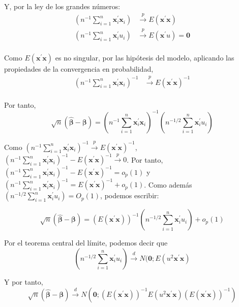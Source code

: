 Y, por la ley de los grandes n\'umeros:
\begin{align*}
\left(n^{-1}\sum_{i=1}^n\boldsymbol{x}_i^{\prime}\boldsymbol{x}_i\right)&\overset{p}{\to}E(\boldsymbol{x}^{\prime}\boldsymbol{x})\\
\left(n^{-1}\sum_{i=1}^n\boldsymbol{x}_i^{\prime}u_i\right)&\overset{p}{\to}E(\boldsymbol{x}^{\prime}u)=\boldsymbol{0}\\
\end{align*}


Como $E(\boldsymbol{x}^{\prime}\boldsymbol{x})$ es no singular, por las hip\'otesis del modelo, aplicando las propiedades de la convergencia en probabilidad, 
\begin{align*}
\left(n^{-1}\sum_{i=1}^n\boldsymbol{x}_i^{\prime}\boldsymbol{x}_i\right)^{-1}&\overset{p}{\to}E(\boldsymbol{x}^{\prime}\boldsymbol{x})^{-1}\\
\end{align*}

Por tanto,
\[\sqrt{n}(\hat{\boldsymbol{\beta}}-\boldsymbol{\beta})=\left(n^{-1}\sum_{i=1}^n\boldsymbol{x}_i^{\prime}\boldsymbol{x}_i\right)^{-1}\left(n^{-1/2}\sum_{i=1}^n\boldsymbol{x}_i^{\prime}u_i\right) \]

Como $\left(n^{-1}\sum_{i=1}^n\boldsymbol{x}_i^{\prime}\boldsymbol{x}_i\right)^{-1}\overset{p}{\to}E(\boldsymbol{x}^{\prime}\boldsymbol{x})^{-1}$, $\left(n^{-1}\sum_{i=1}^n\boldsymbol{x}_i^{\prime}\boldsymbol{x}_i\right)^{-1}-E(\boldsymbol{x}^{\prime}\boldsymbol{x})^{-1}\overset{p}{\to}0$. Por tanto, $\left(n^{-1}\sum_{i=1}^n\boldsymbol{x}_i^{\prime}\boldsymbol{x}_i\right)^{-1}-E(\boldsymbol{x}^{\prime}\boldsymbol{x})^{-1}=o_p(1)$ y $\left(n^{-1}\sum_{i=1}^n\boldsymbol{x}_i^{\prime}\boldsymbol{x}_i\right)^{-1}=E(\boldsymbol{x}^{\prime}\boldsymbol{x})^{-1}+o_p(1)$. Como adem\'as $\left(n^{-1/2}\sum_{i=1}^n\boldsymbol{x}_i^{\prime}u_i\right)=O_p(1)$, podemos escribir:

\[\sqrt{n}(\hat{\boldsymbol{\beta}}-\boldsymbol{\beta})=\left(E(\boldsymbol{x}^{\prime}\boldsymbol{x})\right)^{-1}\left(n^{-1/2}\sum_{i=1}^n\boldsymbol{x}_i^{\prime}u_i\right)+o_p(1) \]

Por el teorema central del l\'imite, podemos decir que 
\[ \left(n^{-1/2}\sum_{i=1}^n\boldsymbol{x}_i^{\prime}u_i\right)\overset{d}{\to}N(\boldsymbol{0};E(u^2\boldsymbol{x}^{\prime}\boldsymbol{x})\]

Y por tanto, 
\[\sqrt{n}(\hat{\boldsymbol{\beta}}-\boldsymbol{\beta})\overset{d}{\to}N(\boldsymbol{0};\left(E(\boldsymbol{x}^{\prime}\boldsymbol{x})\right)^{-1}E(u^2\boldsymbol{x}^{\prime}\boldsymbol{x})\left(E(\boldsymbol{x}^{\prime}\boldsymbol{x})\right)^{-1})\]

